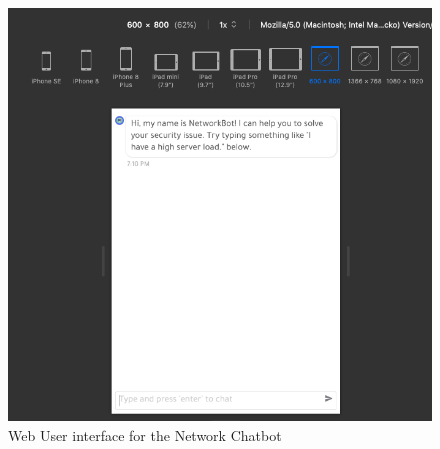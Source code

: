 \begin{figure}[!h]
    \centering
    \includegraphics[scale=0.65]{MA-BA-Thesis/webUIScreen.png}
    \caption{Web User interface for the Network Chatbot}
    \label{fig:screenWeb}
\end{figure}


